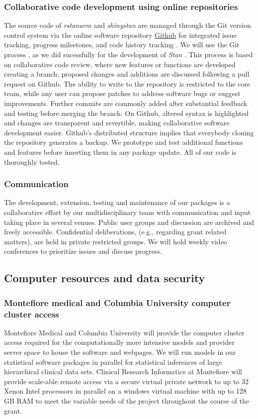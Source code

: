 \documentclass[11pt,notitlepage]{article}
\begin{document}
\subsubsection*{Collaborative code development using online repositories }
The source code of \textit{rstanarm} and \textit{shinystan} are managed through the Git version control system 
\cite{Chacon2009ProGit} via the online software repository \href{https://github.com/}{Github} for integrated issue tracking, 
progress milestones, and code history tracking \cite{loeliger2012version}. We will use the Git process \cite{Driessen2010successful}, 
as we did sucessfully for the development of \textit{Stan} \cite{Stan-manual:2015}. This  process is based on collaborative code review, 
where new features or functions are developed creating a branch; proposed changes and additions are discussed following a pull request on 
Github. The ability to write to the repository is restricted to the core team, while any user can propose patches to address software 
bugs or suggest improvements. Further commits are commonly added after substantial feedback and testing before merging the branch.  
On Github, altered syntax is highlighted and changes are transparent and revertible, making collaborative software development easier. 
Github's distributed structure implies that everybody cloning the repository generates a backup. We prototype and test additional 
functions and features before inserting them in any package update. All of our code is thoroughly tested.

\subsubsection*{Communication}
The development, extension, testing and maintenance of our packages is a collaborative effort by our multidisciplinary team with 
communication and input taking place in several venues. Public user groups and discussion are archived and freely accessible. 
Confidential deliberations, (e.g., regarding grant related matters), are held in private restricted groups. We will hold weekly video 
conferences to prioritize issues and discuss progress.

\subsection*{Computer resources and data security}
\subsubsection*{Montefiore medical and Columbia University computer cluster access}
Montefiore Medical and Columbia University will provide the computer cluster access required for the computationally more intensive 
models and provider server space to house the software and webpages. We will run models in our statistical software packages in parallel 
for statistical inferences of large hierarchical clinical data sets. Clinical Research Informatics at Montefiore will provide scale-able 
remote access via a secure virtual private network to up to 32 Xenon Intel processors in parallel on a windows virtual machine with up to 
128 GB RAM to meet the variable needs of the project throughout the course of the grant. 
\end{document}
